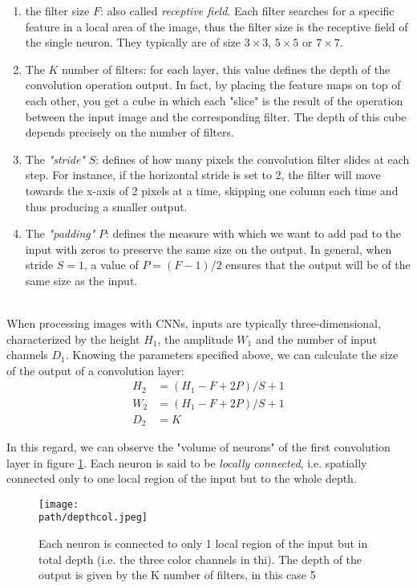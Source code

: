 \begin{enumerate} 
     \item the filter size $F$: also called \emph{receptive field}. Each filter searches for a specific feature in a local area of the image, thus the filter size is the receptive field of the single neuron. They typically are of size $3 \times3$, $5 \times 5$ or $7\times7$.
     
     \item The $K$ number of filters: for each layer, this value defines the depth of the convolution operation output. In fact, by placing the feature maps on top of each other, you get a cube in which each "slice" is the result of the operation between the input image and the corresponding filter. The depth of this cube depends precisely on the number of filters.
     
     \item The \emph{"stride"} $S$: defines of how many pixels the convolution filter slides at each step. For instance, if the horizontal stride is set to 2, the filter will move towards the x-axis of 2 pixels at a time, skipping one column each time and thus producing a smaller output.
     
     \item The \emph{"padding"} $P$: defines the measure with which we want to add pad to the input with zeros to preserve the same size on the output. In general, when stride $S=1$, a value of $P=(F-1)/2$ ensures that the output will be of the same size as the input.
\end{enumerate}

\\

When processing images with CNNs, inputs are typically three-dimensional, characterized by the height $H_1$, the amplitude $W_1$ and the number of input channels $D_1$. Knowing the parameters specified above, we can calculate the size of the output of a convolution layer: 
\begin{align*}
H_2 &=(H_1-F+2P)/S+1\\
W_2 &=(H_1-F+2P)/S+1\\
D_2 &= K
\end{align*}

In this regard, we can observe the "volume of neurons" of the first convolution layer in figure \ref{fig:depth}. Each neuron is said to be \emph{locally connected}, i.e. spatially connected only to one local region of the input but to the whole depth. 


\begin{figure}[h!]
 \centering
 \texttt{[image: \\path/depthcol.jpeg]} 
 \caption{Each neuron is connected to only 1 local region of the input but in total depth (i.e. the three color channels in thi). The depth of the output is given by the K number of filters, in this case 5}
 \label{fig:depth}
\end{figure}


